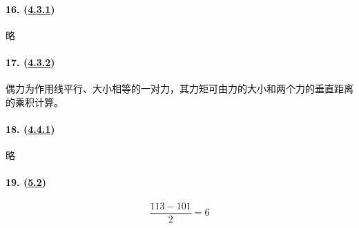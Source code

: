\paragraph{16. (\hyperref[subsec:4.3.1]{4.3.1})} 略
\paragraph{17. (\hyperref[subsec:4.3.2]{4.3.2})} 偶力为作用线平行、大小相等的一对力，其力矩可由力的大小和两个力的垂直距离的乘积计算。
\paragraph{18. (\hyperref[subsec:4.4.1]{4.4.1})} 略
\paragraph{19. (\hyperref[sec:5.2]{5.2})}

\begin{equation*}
    \frac{113-101}{2}=6
\end{equation*}
